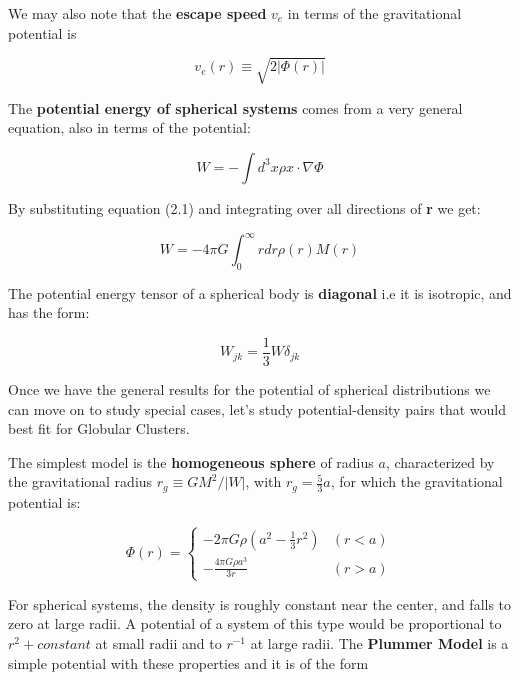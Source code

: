 We may also note that the \textbf{escape speed} $v_{e}$ in terms of the gravitational potential is

\begin{equation}
v_{e}(r)\equiv\sqrt{2|\Phi(r)|}
\end{equation}

The \textbf{potential energy of spherical systems}  comes from a very general equation, also in terms of the potential:

\begin{equation}
W=-\int d^{3}x\rho x\cdot\nabla\Phi
\end{equation}

By substituting equation (2.1) and integrating over all directions of \textbf{r} we get:

\begin{equation}
W=-4\pi G\int_{0}^{\infty}rdr\rho(r)M(r)
\end{equation}

The potential energy tensor of a spherical body is \textbf{diagonal} i.e it is isotropic, and has the form:

\begin{equation}
W_{jk}=\frac{1}{3} W\delta_{jk}
\end{equation}

Once we have the general results for the potential of spherical distributions we can move on to study special cases, let's study potential-density pairs that would best fit for Globular Clusters.

The simplest model is the \textbf{homogeneous sphere} of radius $a$, characterized by the gravitational radius $r_{g}\equiv GM^{2}/|W|$, with $r_{g}=\frac{5}{3}a$, for which the gravitational potential is:

\begin{equation}
\Phi(r) = \left\lbrace
\begin{array}{ll}
-2\pi G\rho\left(a^{2}-\frac{1}{3}r^{2}\right) & (r<a)\\
-\frac{4\pi G\rho a^{3}}{3r} & (r>a)
\end{array}
\right.
\end{equation} 

For spherical systems, the density is roughly constant near the center, and falls to zero at large radii. A potential of a system of this type would be proportional to $r^{2} + constant$ at small radii and to $r^{-1}$ at large radii. The \textbf{Plummer Model} is a simple potential with these properties and it is of the form

